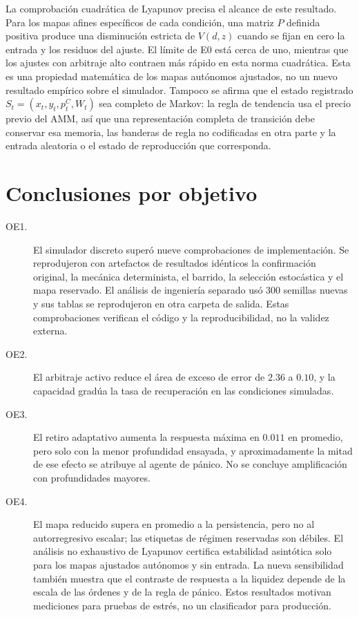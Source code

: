 La comprobación cuadrática de Lyapunov precisa el alcance de este resultado. Para los mapas afines específicos de cada condición, una matriz $P$ definida positiva produce una disminución estricta de $V(d,z)$ cuando se fijan en cero la entrada y los residuos del ajuste. El límite de E0 está cerca de uno, mientras que los ajustes con arbitraje alto contraen más rápido en esta norma cuadrática. Esta es una propiedad matemática de los mapas autónomos ajustados, no un nuevo resultado empírico sobre el simulador. Tampoco se afirma que el estado registrado $S_t=(x_t,y_t,p_t^C,W_t)$ sea completo de Markov: la regla de tendencia usa el precio previo del AMM, así que una representación completa de transición debe conservar esa memoria, las banderas de regla no codificadas en otra parte y la entrada aleatoria o el estado de reproducción que corresponda.

\section{Conclusiones por objetivo}

\begin{description}
  \item[OE1.] El simulador discreto superó nueve comprobaciones de implementación. Se reprodujeron con artefactos de resultados idénticos la confirmación original, la mecánica determinista, el barrido, la selección estocástica y el mapa reservado. El análisis de ingeniería separado usó 300 semillas nuevas y sus tablas se reprodujeron en otra carpeta de salida. Estas comprobaciones verifican el código y la reproducibilidad, no la validez externa.
  \item[OE2.] El arbitraje activo reduce el área de exceso de error de $2.36$ a $0.10$, y la capacidad gradúa la tasa de recuperación en las condiciones simuladas.
  \item[OE3.] El retiro adaptativo aumenta la respuesta máxima en $0.011$ en promedio, pero solo con la menor profundidad ensayada, y aproximadamente la mitad de ese efecto se atribuye al agente de pánico. No se concluye amplificación con profundidades mayores.
  \item[OE4.] El mapa reducido supera en promedio a la persistencia, pero no al autorregresivo escalar; las etiquetas de régimen reservadas son débiles. El análisis no exhaustivo de Lyapunov certifica estabilidad asintótica solo para los mapas ajustados autónomos y sin entrada. La nueva sensibilidad también muestra que el contraste de respuesta a la liquidez depende de la escala de las órdenes y de la regla de pánico. Estos resultados motivan mediciones para pruebas de estrés, no un clasificador para producción.
\end{description}

